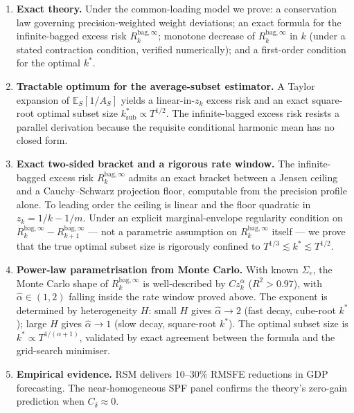 \documentclass[12pt,a4paper]{article}
\theoremstyle{definition}
\newcommand{\Rk}{R_k^{\mathrm{bag},\infty}}
\newcommand{\E}{\mathbb{E}}
\begin{document}
\begin{enumerate}
\item \textbf{Exact theory.}  Under the common-loading model we prove:
  a conservation law governing precision-weighted weight deviations; an
  exact formula for the infinite-bagged excess risk $\Rk$; monotone
  decrease of $\Rk$ in $k$ (under a stated contraction condition, verified
  numerically); and a first-order condition for the optimal $k^*$.

\item \textbf{Tractable optimum for the average-subset estimator.}
  A Taylor expansion of $\E_S[1/A_S]$ yields a linear-in-$z_k$ excess risk
  and an exact square-root optimal subset size $k^*_{\mathrm{sub}}\propto T^{1/2}$.
  The infinite-bagged excess risk resists a parallel derivation because the
  requisite conditional harmonic mean has no closed form.

\item \textbf{Exact two-sided bracket and a rigorous rate window.}
  The infinite-bagged excess risk $\Rk$ admits an exact bracket between a
  Jensen ceiling and a Cauchy--Schwarz projection floor, computable from
  the precision profile alone.  To leading order the ceiling is linear and
  the floor quadratic in $z_k=1/k-1/m$.  Under an explicit marginal-envelope
  regularity condition on $\Rk-R_{k+1}^{\mathrm{bag},\infty}$ --- not a
  parametric assumption on $\Rk$ itself --- we prove that the true optimal
  subset size is rigorously confined to $T^{1/3}\lesssim k^*\lesssim T^{1/2}$.

\item \textbf{Power-law parametrisation from Monte Carlo.}
  With known $\Sigma_e$, the Monte Carlo shape of $\Rk$ is well-described
  by $Cz_k^\alpha$ ($R^2>0.97$), with $\hat\alpha\in(1,2)$ falling inside the
  rate window proved above.  The exponent is
  determined by heterogeneity $H$: small $H$ gives $\hat\alpha\to 2$ (fast
  decay, cube-root $k^*$); large $H$ gives $\hat\alpha\to 1$ (slow decay,
  square-root $k^*$).  The optimal subset size is
  $k^*\propto T^{1/(\alpha+1)}$, validated by exact agreement between the
  formula and the grid-search minimiser.

\item \textbf{Empirical evidence.}  RSM delivers 10--30\% RMSFE reductions
  in GDP forecasting.  The near-homogeneous SPF panel confirms the theory's
  zero-gain prediction when $C_\delta\approx 0$.
\end{enumerate}



\end{document}
